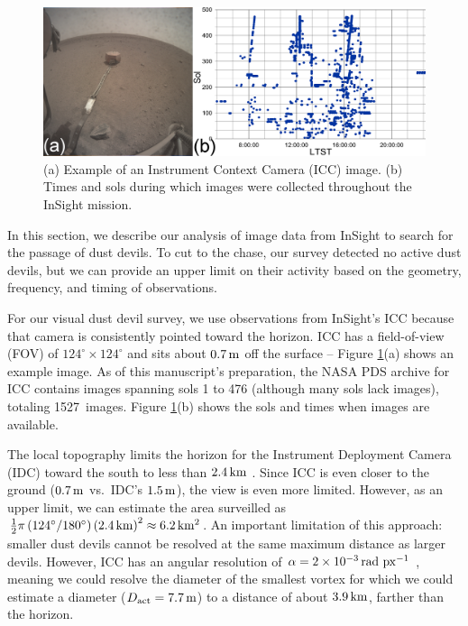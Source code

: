 \documentclass[linenumbers,trackchanges]{aastex63}
\newcommand{\numICCimages}{1527}
\begin{document}
\begin{figure}
    \centering
    \includegraphics[width=\textwidth]{figures/Example-Image_Insight-Combined-Analysis.png}
    \caption{(a) Example of an Instrument Context Camera (ICC) image. (b) Times and sols during which images were collected throughout the InSight mission.}
    \label{fig:Example-Image_Insight-Combined-Analysis}
\end{figure}

In this section, we describe our analysis of image data from InSight to search for the passage of dust devils. To cut to the chase, our survey detected no active dust devils, but we can provide an upper limit on their activity based on the geometry, frequency, and timing of observations.


For our visual dust devil survey, we use observations from InSight's ICC because that camera is consistently pointed toward the horizon. ICC has a field-of-view (FOV) of $124^\circ\times124^\circ$ and sits about $0.7\,{\rm m}$ off the surface \citep{2018SSRv..214..105M} -- Figure \ref{fig:Example-Image_Insight-Combined-Analysis}(a) shows an example image. As of this manuscript's preparation, the NASA PDS archive for ICC contains images spanning sols 1 to 476 (although many sols lack images), totaling \numICCimages\ images. Figure \ref{fig:Example-Image_Insight-Combined-Analysis}(b) shows the sols and times when images are available. 

The local topography limits the horizon for the Instrument Deployment Camera (IDC) toward the south to less than $2.4\,{\rm km}$ \citep{2020E&SS....701248G}. Since ICC is even closer to the ground ($0.7\,{\rm m}$ vs.~IDC's $1.5\,{\rm m}$), the view is even more limited. However, as an upper limit, we can estimate the area surveilled as $\frac{1}{2} \pi \left(124^\circ/180^\circ\right) \left( 2.4\,{\rm km} \right)^2 \approx 6.2\,{\rm km^2}$. An important limitation of this approach: smaller dust devils cannot be resolved at the same maximum distance as larger devils. However, ICC has an angular resolution of $\alpha = 2\times10^{-3}\,{\rm rad\ px^{-1}}$ \citep{2018SSRv..214..105M}, meaning we could resolve the diameter of the smallest vortex for which we could estimate a diameter ($D_{\rm act} = 7.7\,{\rm m}$) to a distance of about $3.9\,{\rm km}$, farther than the horizon.
\end{document}
